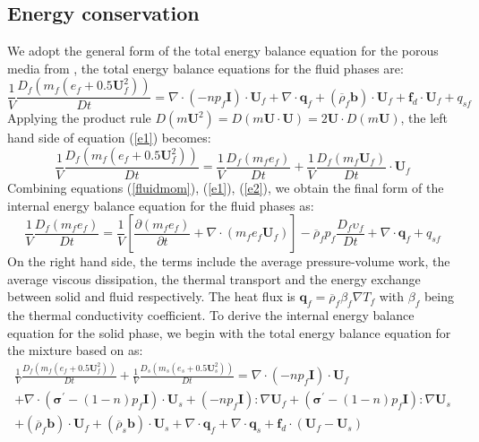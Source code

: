 \documentclass[preprint,12pt]{elsarticle}
\begin{document}
\subsection{\textsf{Energy conservation}}
We adopt the general form of the total energy balance equation for the porous media from \cite{Hassanizadeh}, the total energy balance equations for the fluid phases are:
%
%
\begin{equation}
\label{e1}
     \frac{1}{V}\frac{D_f(m_f (e_f+0.5\pmb{U}_f^2))}{Dt} = \nabla \cdot (-np_f\pmb{I}) \cdot \pmb{U}_f + \nabla \cdot \pmb{q}_f + (\overline{\rho}_f \pmb{b}) \cdot \pmb{U}_f + \pmb{f}_{d} \cdot \pmb{U}_f + q_{sf}
\end {equation}
%
%
Applying the product rule $D(m\pmb{U}^2)=D(m \pmb{U} \cdot \pmb{U}) = 2 \pmb{U} \cdot D(m \pmb{U})$, the left hand side of equation (\ref{e1}) becomes:\\
%
%
\begin{equation}
\label{e2}
     \frac{1}{V}\frac{D_f(m_f (e_f+0.5\pmb{U}_f^2))}{Dt}  = \frac{1}{V}\frac{D_f(m_f e_f)}{Dt} + \frac{1}{V}\frac{D_f(m_f \pmb{U}_f)}{Dt} \cdot \pmb{U}_f 
\end {equation}
%
%
Combining equations (\ref{fluidmom}), (\ref{e1}), (\ref{e2}), we obtain the final form of the internal energy balance equation for the fluid phases as:
%
%
\begin{equation}
     \frac{1}{V}\frac{D_f(m_f e_f)}{Dt} = \frac{1}{V} \left[ \frac{\partial (m_f e_f)}{\partial t} + \nabla \cdot  (m_f e_f \pmb{U}_f) \right] 
    -\overline{\rho}_f p_f  \frac{D_f\upsilon_f}{Dt} + \nabla \cdot \pmb{q}_f + q_{sf}
\end {equation}
%
%
On the right hand side, the terms include the average pressure-volume work, the average viscous dissipation, the thermal transport and the energy exchange between solid and fluid respectively. The heat flux is $\pmb{q}_f = \overline{\rho}_f \beta_f \nabla T_f$ with $\beta_f$ being the thermal conductivity coefficient. To derive the internal energy balance equation for the solid phase, we begin with the total energy balance equation for the mixture based on \cite{Hassanizadeh} as:\\
%
%
\begin{equation}
\label{e3}
\begin{gathered}
     \frac{1}{V}\frac{D_f(m_f (e_f+0.5\pmb{U}_f^2))}{Dt} + \frac{1}{V}\frac{D_s(m_s (e_s+0.5\pmb{U}_s^2))}{Dt} = \nabla \cdot (-np_f\pmb{I}) \cdot \pmb{U}_f \\
     + \nabla \cdot (\pmb{\sigma}^\prime-(1-n)p_f\pmb{I}) \cdot \pmb{U}_s + (-np_f\pmb{I}) : \nabla \pmb{U}_f + (\pmb{\sigma}^\prime-(1-n)p_f\pmb{I}) : \nabla \pmb{U}_s \\
     + (\overline{\rho}_f \pmb{b}) \cdot \pmb{U}_f + (\overline{\rho}_s \pmb{b}) \cdot \pmb{U}_s
     + \nabla \cdot \pmb{q}_f + \nabla \cdot \pmb{q}_s + \pmb{f}_{d} \cdot (\pmb{U}_f - \pmb{U}_s)  
\end {gathered}
\end {equation}
\end{document}
